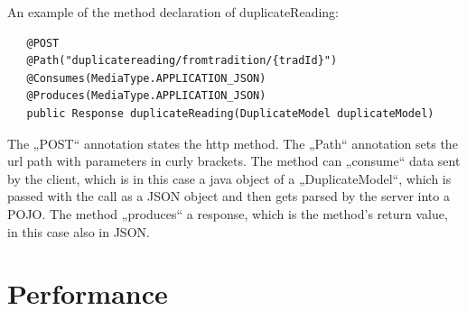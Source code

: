 \documentclass[11pt,fleqn,openany]{book} %
\begin{document}
An example of the method declaration of duplicateReading:
\begin{lstlisting}
   @POST
   @Path("duplicatereading/fromtradition/{tradId}")
   @Consumes(MediaType.APPLICATION_JSON)
   @Produces(MediaType.APPLICATION_JSON)
   public Response duplicateReading(DuplicateModel duplicateModel)
\end{lstlisting}
The „POST“ annotation states the http method. The „Path“ annotation sets the url path with parameters in curly brackets. The method can „consume“ data sent by the client, which is in this case a java object of a „DuplicateModel“, which is passed with the call as a JSON object and then gets parsed by the server into a POJO. The method „produces“ a response, which is the method's return value, in this case also in JSON. 




\chapter{Performance}
\end{document}
